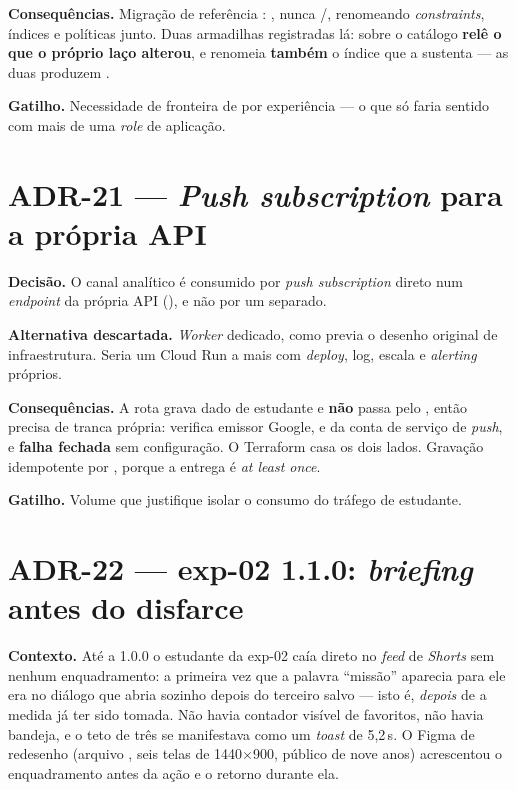 \textbf{Consequências.} Migração de referência
: , nunca
/, renomeando \emph{constraints}, índices e políticas junto.
Duas armadilhas registradas lá:  sobre o catálogo
\textbf{relê o que o próprio laço alterou}, e  renomeia
\textbf{também} o índice que a sustenta --- as duas produzem
.

\textbf{Gatilho.} Necessidade de fronteira de  por experiência --- o
que só faria sentido com mais de uma \emph{role} de aplicação.

\section{ADR-21 --- \emph{Push subscription} para a própria API}

\textbf{Decisão.} O canal analítico é consumido por \emph{push subscription}
direto num \emph{endpoint} da própria API (), e não
por um  separado.

\textbf{Alternativa descartada.} \emph{Worker} dedicado, como previa o desenho
original de infraestrutura. Seria um Cloud Run a mais com \emph{deploy}, log,
escala e \emph{alerting} próprios.

\textbf{Consequências.} A rota grava dado de estudante e \textbf{não} passa pelo
, então precisa de tranca própria:  verifica
emissor Google,  e  da conta de serviço de \emph{push}, e
\textbf{falha fechada} sem configuração. O Terraform casa os dois lados. Gravação
idempotente por , porque a entrega é \emph{at least once}.

\textbf{Gatilho.} Volume que justifique isolar o consumo do tráfego de estudante.


\section{ADR-22 --- exp-02 1.1.0: \emph{briefing} antes do disfarce}

\textbf{Contexto.} Até a 1.0.0 o estudante da exp-02 caía direto no \emph{feed} de
\emph{Shorts} sem nenhum enquadramento: a primeira vez que a palavra
\enquote{missão} aparecia para ele era no diálogo que abria sozinho depois do
terceiro salvo --- isto é, \emph{depois} de a medida já ter sido tomada. Não havia
contador visível de favoritos, não havia bandeja, e o teto de três se manifestava
como um \emph{toast} de 5,2\,s. O Figma de redesenho (arquivo
, seis telas de 1440$\times$900, público de nove anos)
acrescentou o enquadramento antes da ação e o retorno durante ela.

